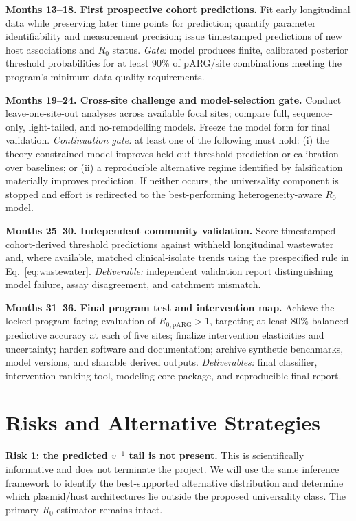 \documentclass[12pt,a4paper]{article}
\newcommand{\RpARG}{R_{0,\mathrm{pARG}}}
\begin{document}
\textbf{Months 13--18. First prospective cohort predictions.} Fit early longitudinal data while preserving later time points for prediction; quantify parameter identifiability and measurement precision; issue timestamped predictions of new host associations and $R_0$ status. \emph{Gate:} model produces finite, calibrated posterior threshold probabilities for at least 90\% of pARG/site combinations meeting the program's minimum data-quality requirements.

\textbf{Months 19--24. Cross-site challenge and model-selection gate.} Conduct leave-one-site-out analyses across available focal sites; compare full, sequence-only, light-tailed, and no-remodelling models. Freeze the model form for final validation. \emph{Continuation gate:} at least one of the following must hold: (i) the theory-constrained model improves held-out threshold prediction or calibration over baselines; or (ii) a reproducible alternative regime identified by falsification materially improves prediction. If neither occurs, the universality component is stopped and effort is redirected to the best-performing heterogeneity-aware $R_0$ model.

\textbf{Months 25--30. Independent community validation.} Score timestamped cohort-derived threshold predictions against withheld longitudinal wastewater and, where available, matched clinical-isolate trends using the prespecified rule in Eq.~\eqref{eq:wastewater}. \emph{Deliverable:} independent validation report distinguishing model failure, assay disagreement, and catchment mismatch.

\textbf{Months 31--36. Final program test and intervention map.} Achieve the locked program-facing evaluation of $\RpARG>1$, targeting at least 80\% balanced predictive accuracy at each of five sites; finalize intervention elasticities and uncertainty; harden software and documentation; archive synthetic benchmarks, model versions, and sharable derived outputs. \emph{Deliverables:} final classifier, intervention-ranking tool, modeling-core package, and reproducible final report.

\section{Risks and Alternative Strategies}

\textbf{Risk 1: the predicted $v^{-1}$ tail is not present.} This is scientifically informative and does not terminate the project. We will use the same inference framework to identify the best-supported alternative distribution and determine which plasmid/host architectures lie outside the proposed universality class. The primary $R_0$ estimator remains intact.
\end{document}
